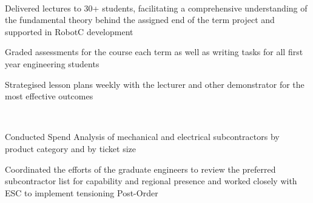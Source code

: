 \documentclass[11pt, a4paper]{TechCV}
\begin{document}
\begin{minipage}[t]{0.58\textwidth}
 \\
\vspace{\topsep} %
\begin{tightemize}
\item Delivered lectures to 30+ students, facilitating a comprehensive understanding of the fundamental theory behind the assigned end of the term project and supported in RobotC development
\item Graded assessments for the course each term as well as writing tasks for all first year engineering students
\item Strategised lesson plans weekly with the lecturer and other demonstrator for the most effective outcomes
\end{tightemize}
\sectionsep

 \\
\vspace{\topsep} %
\begin{tightemize}
\item Conducted Spend Analysis of mechanical and electrical subcontractors by product category and by ticket size
\item Coordinated the efforts of the graduate engineers to review the preferred subcontractor list for capability and regional presence and worked closely with ESC to implement tensioning Post-Order
\end{tightemize}
\sectionsep
\end{minipage} 
\end{document}
